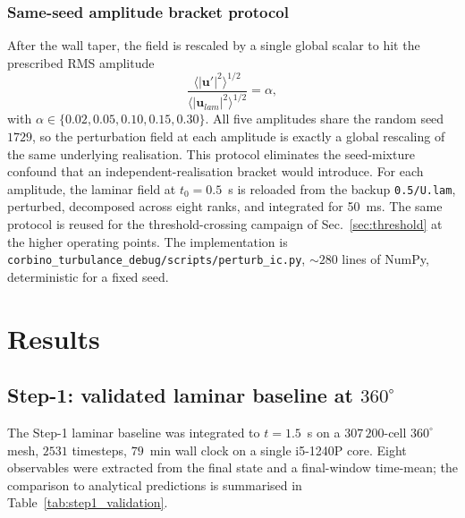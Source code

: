 \documentclass[aps,prl,twocolumn,superscriptaddress]{revtex4-2}
\begin{document}
\subsubsection*{Same-seed amplitude bracket protocol}
After the wall taper, the field is rescaled by a single global
scalar to hit the prescribed RMS amplitude
\begin{equation}
\frac{\langle|\mathbf{u}'|^{2}\rangle^{1/2}}
     {\langle|\mathbf{u}_{lam}|^{2}\rangle^{1/2}} = \alpha,
\label{eq:rms}
\end{equation}
with $\alpha \in \{0.02, 0.05, 0.10, 0.15, 0.30\}$.  All five
amplitudes share the random seed $1729$, so the perturbation field at
each amplitude is exactly a global rescaling of the same underlying
realisation.  This protocol eliminates the seed-mixture confound that
an independent-realisation bracket would introduce.  For each
amplitude, the laminar field at $t_0 = 0.5$~s is reloaded from the
backup \texttt{0.5/U.lam}, perturbed, decomposed across eight ranks,
and integrated for 50~ms.  The same protocol is reused for the
threshold-crossing campaign of Sec.~\ref{sec:threshold} at the
higher operating points.  The implementation is
\texttt{corbino\_turbulance\_debug/scripts/perturb\_ic.py},
$\sim\!280$ lines of NumPy, deterministic for a fixed seed.


\section{Results}
\label{sec:results}

\subsection{Step-1: validated laminar baseline at $360^{\circ}$}
\label{sec:results_step1}

The Step-1 laminar baseline was integrated to $t = 1.5$~s on a
$307\,200$-cell $360^{\circ}$ mesh, $2531$ timesteps, $79$~min wall
clock on a single i5-1240P core.  Eight observables were extracted
from the final state and a final-window time-mean; the comparison to
analytical predictions is summarised in
Table~\ref{tab:step1_validation}.
\end{document}
